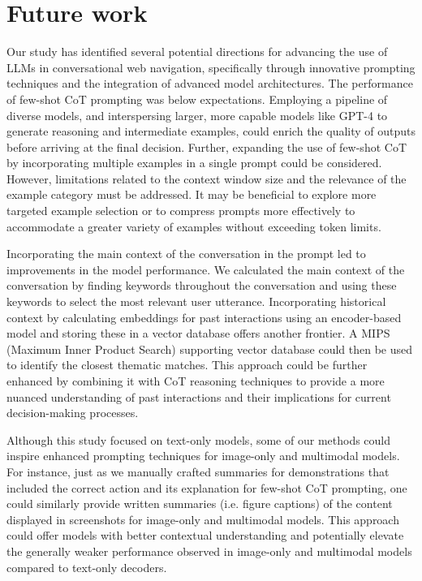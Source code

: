 \documentclass[11pt]{article}
\begin{document}
\section{Future work}
Our study has identified several potential directions for advancing the use of LLMs in conversational web navigation, specifically through innovative prompting techniques and the integration of advanced model architectures. The performance of few-shot CoT prompting was below expectations. Employing a pipeline of diverse models, and interspersing larger, more capable models like GPT-4 to generate reasoning and intermediate examples, could enrich the quality of outputs before arriving at the final decision. Further, expanding the use of few-shot CoT by incorporating multiple examples in a single prompt could be considered. However, limitations related to the context window size and the relevance of the example category must be addressed. It may be beneficial to explore more targeted example selection or to compress prompts more effectively to accommodate a greater variety of examples without exceeding token limits.

Incorporating the main context of the conversation in the prompt led to improvements in the model performance. We calculated the main context of the conversation by finding keywords throughout the conversation and using these keywords to select the most relevant user utterance. Incorporating historical context by calculating embeddings for past interactions using an encoder-based model and storing these in a vector database offers another frontier. A MIPS (Maximum Inner Product Search) supporting vector database could then be used to identify the closest thematic matches. This approach could be further enhanced by combining it with CoT reasoning techniques to provide a more nuanced understanding of past interactions and their implications for current decision-making processes.

Although this study focused on text-only models, some of our methods could inspire enhanced prompting techniques for image-only and multimodal models. For instance, just as we manually crafted summaries for demonstrations that included the correct action and its explanation for few-shot CoT prompting, one could similarly provide written summaries (i.e. figure captions) of the content displayed in screenshots for image-only and multimodal models. This approach could offer models with better contextual understanding and potentially elevate the generally weaker performance observed in image-only and multimodal models compared to text-only decoders.
\end{document}

